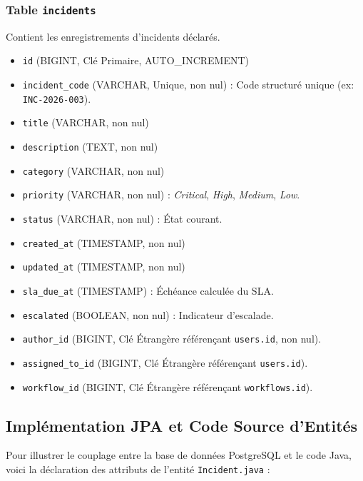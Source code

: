 \documentclass[12pt,a4paper]{article}
\begin{document}
\subsubsection{Table \texttt{incidents}}
Contient les enregistrements d'incidents déclarés.
\begin{itemize}
    \item \texttt{id} (BIGINT, Clé Primaire, AUTO\_INCREMENT)
    \item \texttt{incident\_code} (VARCHAR, Unique, non nul) : Code structuré unique (ex: \texttt{INC-2026-003}).
    \item \texttt{title} (VARCHAR, non nul)
    \item \texttt{description} (TEXT, non nul)
    \item \texttt{category} (VARCHAR, non nul)
    \item \texttt{priority} (VARCHAR, non nul) : \textit{Critical}, \textit{High}, \textit{Medium}, \textit{Low}.
    \item \texttt{status} (VARCHAR, non nul) : État courant.
    \item \texttt{created\_at} (TIMESTAMP, non nul)
    \item \texttt{updated\_at} (TIMESTAMP, non nul)
    \item \texttt{sla\_due\_at} (TIMESTAMP) : Échéance calculée du SLA.
    \item \texttt{escalated} (BOOLEAN, non nul) : Indicateur d'escalade.
    \item \texttt{author\_id} (BIGINT, Clé Étrangère référençant \texttt{users.id}, non nul).
    \item \texttt{assigned\_to\_id} (BIGINT, Clé Étrangère référençant \texttt{users.id}).
    \item \texttt{workflow\_id} (BIGINT, Clé Étrangère référençant \texttt{workflows.id}).
\end{itemize}

\subsection{Implémentation JPA et Code Source d'Entités}
Pour illustrer le couplage entre la base de données PostgreSQL et le code Java, voici la déclaration des attributs de l'entité \texttt{Incident.java} :
\end{document}

